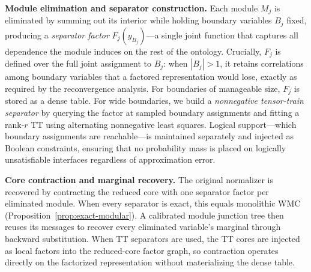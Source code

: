 \textbf{Module elimination and separator construction.}
Each module $M_j$ is eliminated by summing out its interior while
holding boundary variables $B_j$ fixed, producing a \emph{separator
factor} $F_j(y_{B_j})$---a single joint function that captures all
dependence the module induces on the rest of the ontology. Crucially,
$F_j$ is defined over the full joint assignment to $B_j$: when
$|B_j| > 1$, it retains correlations among boundary variables that a
factored representation would lose, exactly as required by the
reconvergence analysis. For boundaries of manageable size, $F_j$ is
stored as a dense table. For wide boundaries, we build a
\emph{nonnegative tensor-train separator} by querying the factor at
sampled boundary assignments and fitting a rank-$r$ TT using
alternating nonnegative least squares. Logical support---which boundary
assignments are reachable---is maintained separately and injected as
Boolean constraints, ensuring that no probability mass is placed on
logically unsatisfiable interfaces regardless of approximation error.

\textbf{Core contraction and marginal recovery.}
The original normalizer is recovered by contracting the reduced core with
one separator factor per eliminated module. When every separator is
exact, this equals monolithic WMC (Proposition~\ref{prop:exact-modular}).
A calibrated module junction tree then reuses its messages to recover
every eliminated variable's marginal through backward substitution.
When TT separators are used, the TT cores are injected as local factors
into the reduced-core factor graph, so contraction operates directly on
the factorized representation without materializing the dense table.

